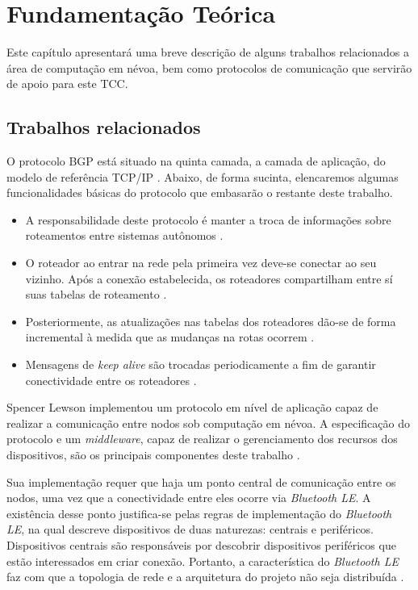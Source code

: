 \chapter{\label{chap:chap2} Fundamentação Teórica}

Este capítulo apresentará uma breve descrição de alguns trabalhos relacionados a área de computação em névoa, bem como protocolos de comunicação que servirão de apoio para este TCC.


\section{Trabalhos relacionados}


O protocolo BGP está situado na quinta camada, a camada de aplicação, do modelo de referência TCP/IP \cite{tanenbaum2011redes}.
Abaixo, de forma sucinta, elencaremos algumas funcionalidades básicas do protocolo que embasarão o restante deste trabalho.

\begin{itemize}
    \item A responsabilidade deste protocolo é manter a troca de informações sobre roteamentos entre sistemas autônomos \cite{Rekhter:1995}.
    \item O roteador ao entrar na rede pela primeira vez deve-se conectar ao seu vizinho. Após a conexão estabelecida, os roteadores compartilham entre sí suas tabelas de roteamento \cite{Rekhter:1995}.
    \item Posteriormente, as atualizações nas tabelas dos roteadores dão-se de forma incremental à medida que as mudanças na rotas ocorrem \cite{Rekhter:1995}.
    \item Mensagens de \textit{keep alive} são trocadas periodicamente a fim de garantir conectividade entre os roteadores \cite{Rekhter:1995}.
\end{itemize}

Spencer Lewson implementou um protocolo em nível de aplicação \cite{tanenbaum2011redes} capaz de realizar a comunicação entre nodos sob computação em névoa.
A especificação do protocolo e um \textit{middleware}, capaz de realizar o gerenciamento dos recursos dos dispositivos, são os principais componentes deste trabalho \cite{Spencer:2015}.

Sua implementação requer que haja um ponto central de comunicação entre os nodos, uma vez que a conectividade entre eles ocorre via \textit{Bluetooth LE}.
A existência desse ponto justifica-se pelas regras de implementação do \textit{Bluetooth LE}, na qual descreve dispositivos de duas naturezas: centrais e periféricos.
Dispositivos centrais são responsáveis por descobrir dispositivos periféricos que estão interessados em criar conexão.
Portanto, a característica do \textit{Bluetooth LE} faz com que a topologia de rede e a arquitetura do projeto não seja distribuída \cite{Spencer:2015}.

